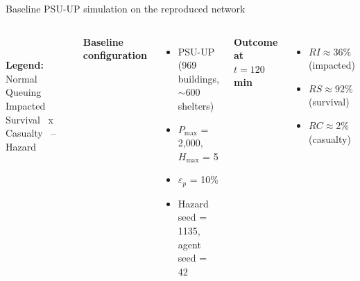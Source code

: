 \documentclass[aspectratio=169, xcolor=table]{beamer}
\newcommand{\simlegend}{\fontsize{6}{6.8}\selectfont
\textbf{Legend:}
\textcolor{statenormal}{\textbullet} Normal \,
\textcolor{statequeuing}{\textbullet} Queuing \,
\textcolor{stateimpacted}{\textbullet} Impacted \,
\textcolor{statesurvival}{\textbullet} Survival \,
\textcolor{statecasualty}{x} Casualty \,
\textcolor{highlightred}{-- Hazard}}
\begin{document}
\begin{frame}[t]{Baseline PSU-UP simulation on the reproduced network}
\footnotesize

\begin{columns}[T,onlytextwidth]
\begin{center}
\\[-0.2em]
{\parbox{0.98\linewidth}{\centering\simlegend}}
\end{center}

\vspace{0.1em}
\textbf{Baseline configuration}
\scriptsize
\begin{itemize}\itemsep0.15em
  \item PSU-UP (969 buildings, $\sim$600 shelters)
  \item $P_{\max}$ = 2{,}000, $H_{\max}$ = 5
  \item $\varepsilon_p$ = 10\%
  \item Hazard seed = 1135, agent seed = 42
\end{itemize}

\vspace{0.35em}
\textbf{Outcome at $t=120$ min}
\scriptsize
\begin{itemize}\itemsep0.1em
  \item $RI \approx 36\%$ (impacted)
  \item $RS \approx 92\%$ (survival)
  \item $RC \approx 2\%$ (casualty)
\end{itemize}

\end{columns}
\end{frame}
\end{document}
